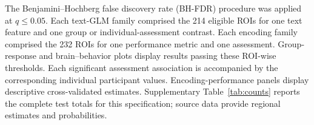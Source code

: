 The Benjamini--Hochberg false discovery rate (BH-FDR) procedure \cite{bh} was applied at $q\leq0.05$. Each text-GLM family comprised the 214 eligible ROIs for one text feature and one group or individual-assessment contrast. Each encoding family comprised the 232 ROIs for one performance metric and one assessment. Group-response and brain--behavior plots display results passing these ROI-wise thresholds. Each significant assessment association is accompanied by the corresponding individual participant values. Encoding-performance panels display descriptive cross-validated estimates. Supplementary Table~\ref{tab:counts} reports the complete test totals for this specification; source data provide regional estimates and probabilities.

